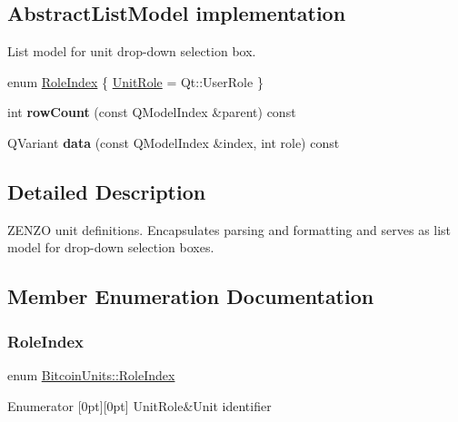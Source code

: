 \subsection*{Abstract\+List\+Model implementation}
\label{_amgrp2e845e8604997c2ca3724f5375e55564}%
 List model for unit drop-\/down selection box. \begin{DoxyCompactItemize}
\item 
enum \mbox{\hyperlink{class_bitcoin_units_a094a1a150647021c419f06a923795959}{Role\+Index}} \{ \mbox{\hyperlink{class_bitcoin_units_a094a1a150647021c419f06a923795959adba268d796f853874a3b830bb92c5c80}{Unit\+Role}} = Qt\+::User\+Role
 \}
\item 
\mbox{\label{class_bitcoin_units_aa3f7476c7e9a452082977a48384d8814}} 
int {\bfseries row\+Count} (const Q\+Model\+Index \&parent) const
\item 
\mbox{\label{class_bitcoin_units_a576f4d0219a807146cf0306a824c5ef9}} 
Q\+Variant {\bfseries data} (const Q\+Model\+Index \&index, int role) const
\end{DoxyCompactItemize}


\subsection{Detailed Description}
Z\+E\+N\+ZO unit definitions. Encapsulates parsing and formatting and serves as list model for drop-\/down selection boxes. 

\subsection{Member Enumeration Documentation}
\mbox{\label{class_bitcoin_units_a094a1a150647021c419f06a923795959}} 
\subsubsection{\texorpdfstring{RoleIndex}{RoleIndex}}
{\footnotesize\ttfamily enum \mbox{\hyperlink{class_bitcoin_units_a094a1a150647021c419f06a923795959}{Bitcoin\+Units\+::\+Role\+Index}}}

\begin{DoxyEnumFields}{Enumerator}
[0pt][0pt]{}\mbox{\label{class_bitcoin_units_a094a1a150647021c419f06a923795959adba268d796f853874a3b830bb92c5c80}} 
Unit\+Role&Unit identifier \\
\hline

\end{DoxyEnumFields}
\mbox{\label{class_bitcoin_units_ae41018ba530b4c8bdc74fd163709fb9d}} 
